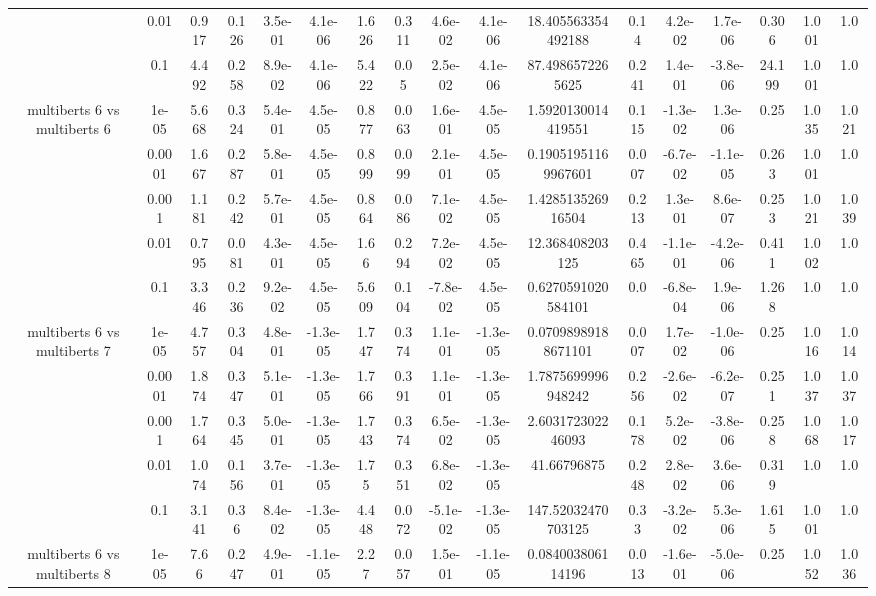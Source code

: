 \begin{tabular}{|c|c|c|c|c|c|c|c|c|c|c|c|c|c|c|c|c|}
 & 0.01 & 0.917 & 0.126 & 3.5e-01 & 4.1e-06 & 1.626 & 0.311 & 4.6e-02 & 4.1e-06 & 18.405563354492188 & 0.14 & 4.2e-02 & 1.7e-06 & 0.306 & 1.001 & 1.0 \\
 & 0.1 & 4.492 & 0.258 & 8.9e-02 & 4.1e-06 & 5.422 & 0.05 & 2.5e-02 & 4.1e-06 & 87.4986572265625 & 0.241 & 1.4e-01 & -3.8e-06 & 24.199 & 1.001 & 1.0 \\
\hline
\multirow{5}{*}{multiberts 6 vs multiberts 6} & 1e-05 & 5.668 & 0.324 & 5.4e-01 & 4.5e-05 & 0.877 & 0.063 & 1.6e-01 & 4.5e-05 & 1.5920130014419551 & 0.115 & -1.3e-02 & 1.3e-06 & 0.25 & 1.035 & 1.021 \\
 & 0.0001 & 1.667 & 0.287 & 5.8e-01 & 4.5e-05 & 0.899 & 0.099 & 2.1e-01 & 4.5e-05 & 0.19051951169967601 & 0.007 & -6.7e-02 & -1.1e-05 & 0.263 & 1.001 & 1.0 \\
 & 0.001 & 1.181 & 0.242 & 5.7e-01 & 4.5e-05 & 0.864 & 0.086 & 7.1e-02 & 4.5e-05 & 1.428513526916504 & 0.213 & 1.3e-01 & 8.6e-07 & 0.253 & 1.021 & 1.039 \\
 & 0.01 & 0.795 & 0.081 & 4.3e-01 & 4.5e-05 & 1.66 & 0.294 & 7.2e-02 & 4.5e-05 & 12.368408203125 & 0.465 & -1.1e-01 & -4.2e-06 & 0.411 & 1.002 & 1.0 \\
 & 0.1 & 3.346 & 0.236 & 9.2e-02 & 4.5e-05 & 5.609 & 0.104 & -7.8e-02 & 4.5e-05 & 0.6270591020584101 & 0.0 & -6.8e-04 & 1.9e-06 & 1.268 & 1.0 & 1.0 \\
\hline
\multirow{5}{*}{multiberts 6 vs multiberts 7} & 1e-05 & 4.757 & 0.304 & 4.8e-01 & -1.3e-05 & 1.747 & 0.374 & 1.1e-01 & -1.3e-05 & 0.07098989188671101 & 0.007 & 1.7e-02 & -1.0e-06 & 0.25 & 1.016 & 1.014 \\
 & 0.0001 & 1.874 & 0.347 & 5.1e-01 & -1.3e-05 & 1.766 & 0.391 & 1.1e-01 & -1.3e-05 & 1.7875699996948242 & 0.256 & -2.6e-02 & -6.2e-07 & 0.251 & 1.037 & 1.037 \\
 & 0.001 & 1.764 & 0.345 & 5.0e-01 & -1.3e-05 & 1.743 & 0.374 & 6.5e-02 & -1.3e-05 & 2.603172302246093 & 0.178 & 5.2e-02 & -3.8e-06 & 0.258 & 1.068 & 1.017 \\
 & 0.01 & 1.074 & 0.156 & 3.7e-01 & -1.3e-05 & 1.75 & 0.351 & 6.8e-02 & -1.3e-05 & 41.66796875 & 0.248 & 2.8e-02 & 3.6e-06 & 0.319 & 1.0 & 1.0 \\
 & 0.1 & 3.141 & 0.36 & 8.4e-02 & -1.3e-05 & 4.448 & 0.072 & -5.1e-02 & -1.3e-05 & 147.52032470703125 & 0.33 & -3.2e-02 & 5.3e-06 & 1.615 & 1.001 & 1.0 \\
\hline
\multirow{5}{*}{multiberts 6 vs multiberts 8} & 1e-05 & 7.66 & 0.247 & 4.9e-01 & -1.1e-05 & 2.27 & 0.057 & 1.5e-01 & -1.1e-05 & 0.084003806114196 & 0.013 & -1.6e-01 & -5.0e-06 & 0.25 & 1.052 & 1.036 \\

\end{tabular}
